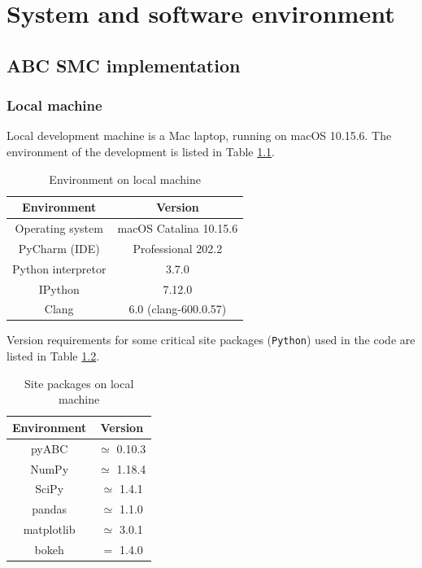 \appendix

\chapter{System and software environment}

\section{ABC SMC implementation}

\subsection{Local machine}

Local development machine is a Mac laptop, running on macOS 10.15.6. The environment of the development is listed in Table \ref{table:local_macine}.

\begin{table}[H]
    \centering
    \begin{tabular}{|c c|}
        \hline
        Environment        & Version                \\ [0.5ex]
        \hline\hline
        Operating system   & macOS Catalina 10.15.6 \\
        PyCharm (IDE)      & Professional 202.2     \\
        Python interpretor & 3.7.0                  \\
        IPython            & 7.12.0                 \\
        Clang              & 6.0 (clang-600.0.57)   \\
        \hline
    \end{tabular}
    \caption{Environment on local machine}
    \label{table:local_macine}
\end{table}

Version requirements for some critical site packages (\verb|Python|) used in the code are listed in Table \ref{table:local_package}.

\begin{table}
    \centering
    \begin{tabular}{|c c|}
        \hline
        Environment & Version         \\ [0.5ex]
        \hline\hline
        pyABC       & $\simeq$ 0.10.3 \\
        NumPy       & $\simeq$ 1.18.4 \\
        SciPy       & $\simeq$ 1.4.1  \\
        pandas      & $\simeq$ 1.1.0  \\
        matplotlib  & $\simeq$ 3.0.1  \\
        bokeh       & $=$ 1.4.0       \\
        \hline
    \end{tabular}
    \caption{Site packages on local machine}
    \label{table:local_package}
\end{table}


